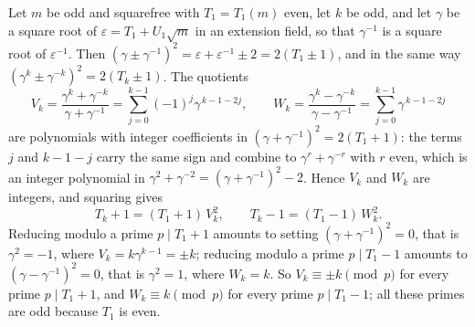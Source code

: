 \begin{remark}
Let $m$ be odd and squarefree with $T_1 = T_1(m)$ even, let $k$ be odd, and let $\gamma$ be a square root of $\varepsilon = T_1 + U_1\sqrt m$
in an extension field, so that $\gamma^{-1}$ is a square root of $\varepsilon^{-1}$. Then $(\gamma \pm \gamma^{-1})^2 = \varepsilon + \varepsilon^{-1} \pm 2 = 2(T_1 \pm 1)$,
and in the same way $(\gamma^k \pm \gamma^{-k})^2 = 2(T_k \pm 1)$. The quotients
\[
V_k = \frac{\gamma^k + \gamma^{-k}}{\gamma + \gamma^{-1}} = \sum_{j=0}^{k-1} (-1)^j \gamma^{\,k-1-2j}, \qquad
W_k = \frac{\gamma^k - \gamma^{-k}}{\gamma - \gamma^{-1}} = \sum_{j=0}^{k-1} \gamma^{\,k-1-2j}
\]
are polynomials with integer coefficients in $(\gamma + \gamma^{-1})^2 = 2(T_1 + 1)$: the terms $j$ and $k - 1 - j$ carry the same sign and
combine to $\gamma^{r} + \gamma^{-r}$ with $r$ even, which is an integer polynomial in $\gamma^2 + \gamma^{-2} = (\gamma + \gamma^{-1})^2 - 2$. Hence
$V_k$ and $W_k$ are integers, and squaring gives
\[
T_k + 1 = (T_1 + 1)\,V_k^2, \qquad T_k - 1 = (T_1 - 1)\,W_k^2 .
\]
Reducing modulo a prime $p \mid T_1 + 1$ amounts to setting $(\gamma + \gamma^{-1})^2 = 0$, that is $\gamma^2 = -1$, where $V_k = k\gamma^{k-1} = \pm k$;
reducing modulo a prime $p \mid T_1 - 1$ amounts to $(\gamma - \gamma^{-1})^2 = 0$, that is $\gamma^2 = 1$, where $W_k = k$. So
$V_k \equiv \pm k \pmod p$ for every prime $p \mid T_1 + 1$, and $W_k \equiv k \pmod p$ for every prime $p \mid T_1 - 1$; all these primes are odd because $T_1$ is even.


\end{remark}
